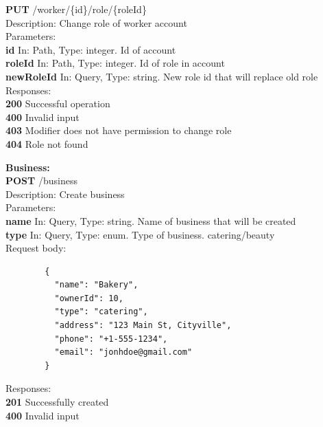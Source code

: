 \documentclass[11pt,a4paper,pdftex]{article}
\begin{document}
\hspace*{1em}\textbf{PUT} /worker/\{id\}/role/\{roleId\}\\
\hspace*{2em}Description: Change role of worker account\\
\hspace*{2em}Parameters:\\
\hspace*{3em}\textbf{id} In: Path, Type: integer. Id of account\\
\hspace*{3em}\textbf{roleId} In: Path, Type: integer. Id of role in account\\
\hspace*{3em}\textbf{newRoleId} In: Query, Type: string. New role id that will replace old role\\
\hspace*{2em}Responses:\\
\hspace*{3em}\textbf{200} Successful operation\\
\hspace*{3em}\textbf{400} Invalid input\\
\hspace*{3em}\textbf{403} Modifier does not have permission to change role\\
\hspace*{3em}\textbf{404} Role not found

\textbf{Business:}\\
\hspace*{1em}\textbf{POST} /business\\
\hspace*{2em}Description: Create business\\
\hspace*{2em}Parameters:\\
\hspace*{3em}\textbf{name} In: Query, Type: string. Name of business that will be created\\
\hspace*{3em}\textbf{type} In: Query, Type: enum. Type of business. catering/beauty\\
\hspace*{2em}Request body:
\begin{verbatim}
        {
          "name": "Bakery",
          "ownerId": 10,
          "type": "catering",
          "address": "123 Main St, Cityville",
          "phone": "+1-555-1234",
          "email": "jonhdoe@gmail.com"
        }
\end{verbatim}
\hspace*{2em}Responses:\\
\hspace*{3em}\textbf{201} Successfully created\\
\hspace*{3em}\textbf{400} Invalid input
\end{document}
